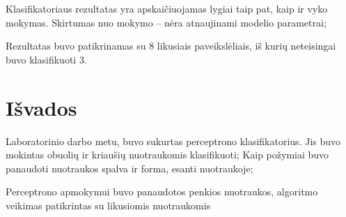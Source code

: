 \documentclass[11pt, a4paper, lithuanian]{article}
\begin{document}
        Klasifikatoriaus rezultatas yra apskaičiuojamas lygiai taip pat, kaip ir vyko mokymas. Skirtumas nuo mokymo -- nėra atnaujinami modelio parametrai;

        Rezultatas buvo patikrinamas su 8 likusiais paveikslėliais, iš kurių neteisingai buvo klasifikuoti 3.

    \section{Išvados}

        Laboratorinio darbo metu, buvo sukurtas perceptrono klasifikatorius. Jis buvo mokintas obuolių ir kriaušių nuotraukomis klasifikuoti; Kaip požymiai buvo panaudoti nuotraukos spalva ir forma, esanti nuotraukoje;

        Perceptrono apmokymui buvo panaudotos penkios nuotraukos, algoritmo veikimas patikrintas su likusiomis nuotraukomis
\end{document}
